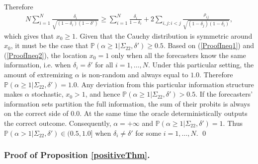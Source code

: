 \documentclass[11pt]{article}
\renewcommand{\P}{\mathbb{P}}
\theoremstyle{definition}
\theoremstyle{definition}
\def\P{{\mathbb P}}
\begin{document}
Therefore 
\begin{align*}
N \sum_{i=1}^N \frac{\delta_i}{\sqrt{(1-\delta_i)(1-\delta')}} \geq \sum_{i=1}^N \frac{\delta_i}{1-\delta_i} + 2 \sum_{i,j: i<j} \frac{\rho_{ij}}{\sqrt{(1-\delta_j)(1-\delta_i)}},
\end{align*}
which gives that $x_0 \geq 1$. Given that the Cauchy distribution is symmetric around $x_0$, it must be the case that $\P(\alpha \geq 1 | \Sigma_{22}, \delta') \geq 0.5$. Based on (\ref{ProofIneq1}) and (\ref{ProofIneq2}), the location $x_0 = 1$ only when all the forecasters know the same information, i.e. when $\delta_i = \delta'$ for all $i = 1, \dots, N$. Under this particular setting, the amount of extremizing $\alpha$ is non-random and always equal to $1.0$. Therefore $\P(\alpha \geq 1 | \Sigma_{22}, \delta') = 1.0$.  Any deviation from this particular information structure makes $\alpha$ stochastic, $x_0 > 1$, and hence $\P(\alpha \geq 1 | \Sigma_{22}, \delta') > 0.5$. If the forecasters' information sets partition the full information, the sum of their probits is always on the correct side of $0.0$. At the same time the oracle deterministically outputs the correct outcome. Consequently, $\alpha = +\infty$ and $\P(\alpha \geq 1 | \Sigma_{22}, \delta') = 1$. Thus $\P(\alpha > 1 | \Sigma_{22}, \delta') \in (0.5, 1.0]$ when $\delta_i \neq \delta'$ for some $i = 1, \dots, N$. \qed
\subsubsection{Proof of Proposition \ref{positiveThm}.}
\end{document}
